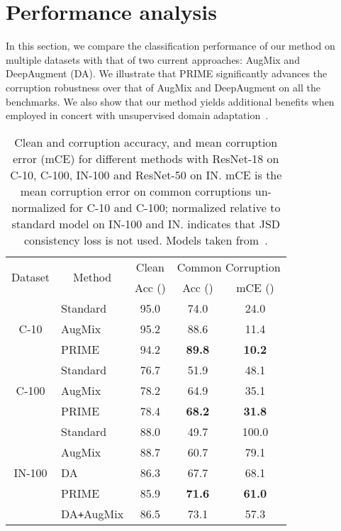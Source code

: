 \documentclass[runningheads]{llncs}
\begin{document}
\section{Performance analysis}
\label{sec:experimental}


In this section, we compare the classification performance of our method on multiple datasets with that of two current approaches: AugMix and DeepAugment (DA). We illustrate that PRIME significantly advances the corruption robustness over that of AugMix and DeepAugment on all the benchmarks. We also show that our method yields additional benefits when employed in concert with unsupervised domain adaptation~\cite{bnadapt_bethge2021}.

\begin{table}[t]
    \centering
    \footnotesize
    \caption{Clean and corruption accuracy, and mean corruption error (mCE) for different methods with ResNet-18 on C-10, C-100, IN-100 and ResNet-50 on IN. mCE is the mean corruption error on common corruptions un-normalized for C-10 and C-100; normalized relative to standard model on IN-100 and IN.  indicates that JSD consistency loss is not used. Models taken from~\cite{robustbench2021}.}
    \begin{tabular}{clccc}
        \toprule
        \multirow{2}{*}{Dataset} & \multicolumn{1}{c}{\multirow{2}{*}{Method}} & Clean & \multicolumn{2}{c}{Common Corruption}\\
        & & Acc () & Acc () & mCE ()\\
        \midrule
        \multirow{3}{*}{C-10} & Standard & 95.0 & 74.0 & 24.0\\
        & AugMix & 95.2 & 88.6 & 11.4\\
        & PRIME & 94.2 & \textbf{89.8} & \textbf{10.2}\\
        \midrule
        \multirow{3}{*}{C-100}& Standard & 76.7 & 51.9 & 48.1\\
        & AugMix & 78.2 & 64.9 & 35.1\\
        & PRIME & 78.4 & \textbf{68.2} & \textbf{31.8}\\
        \midrule
        \multirow{6}{*}{IN-100} & Standard & 88.0 & 49.7 & 100.0\\
        & AugMix & 88.7	& 60.7 & 79.1\\
        & DA & 86.3 & 67.7 & 68.1\\
        & PRIME & 85.9 & \textbf{71.6} & \textbf{61.0}\\
        \cmidrule{2-5}
        & DA\texttt{+}AugMix & 86.5 & 73.1 & 57.3\\

\end{tabular}
\end{table}
\end{document}
